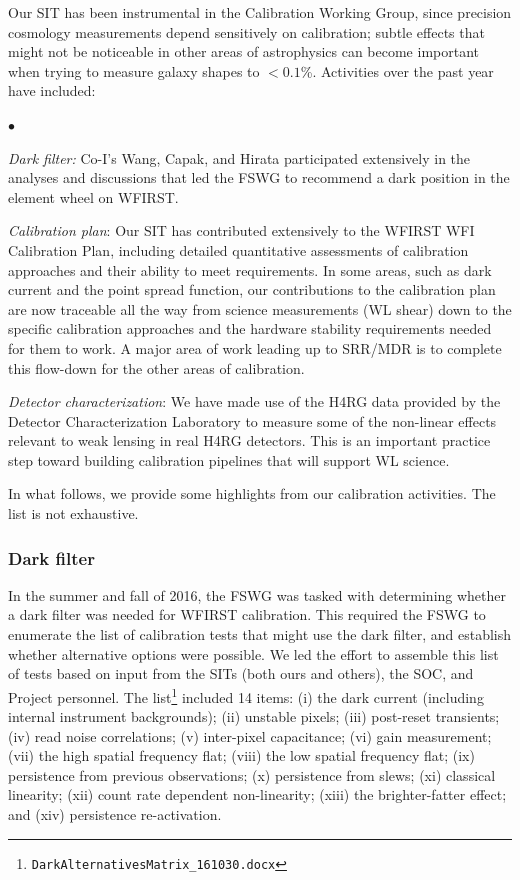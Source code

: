 Our SIT has been instrumental in the Calibration Working Group, since precision cosmology measurements depend sensitively on calibration; subtle effects that might not be noticeable in other areas of astrophysics can become important when trying to measure galaxy shapes to $<0.1$\%. Activities over the past year have included:
\begin{list}{$\bullet$}{}
\item
{\em Dark filter:} Co-I's Wang, Capak, and Hirata participated extensively in the analyses and discussions that led the FSWG to recommend a dark position in the element wheel on WFIRST.
\item
{\em Calibration plan}: Our SIT has contributed extensively to the WFIRST WFI Calibration Plan, including detailed quantitative assessments of calibration approaches and their ability to meet requirements. In some areas, such as dark current and the point spread function, our contributions to the calibration plan are now traceable all the way from science measurements (WL shear) down to the specific calibration approaches and the hardware stability requirements needed for them to work. A major area of work leading up to SRR/MDR is to complete this flow-down for the other areas of calibration.
\item
{\em Detector characterization}: We have made use of the H4RG data provided by the Detector Characterization Laboratory to measure some of the non-linear effects relevant to weak lensing in real H4RG detectors. This is an important practice step toward building calibration pipelines that will support WL science.
\end{list}
In what follows, we provide some highlights from our calibration activities. The list is not exhaustive.

\subsubsection{Dark filter}

In the summer and fall of 2016, the FSWG was tasked with determining whether a dark filter was needed for WFIRST calibration. This required the FSWG to enumerate the list of calibration tests that might use the dark filter, and establish whether alternative options were possible. We led the effort to assemble this list of tests based on input from the SITs (both ours and others), the SOC, and  Project personnel. The list\footnote{\tt DarkAlternativesMatrix\_161030.docx} included 14 items: (i) the dark current (including internal instrument backgrounds); (ii) unstable pixels; (iii) post-reset transients; (iv) read noise correlations; (v) inter-pixel capacitance; (vi) gain measurement; (vii) the high spatial frequency flat; (viii) the low spatial frequency flat; (ix) persistence from previous observations; (x) persistence from slews; (xi) classical linearity; (xii) count rate dependent non-linearity; (xiii) the brighter-fatter effect; and (xiv) persistence re-activation.

